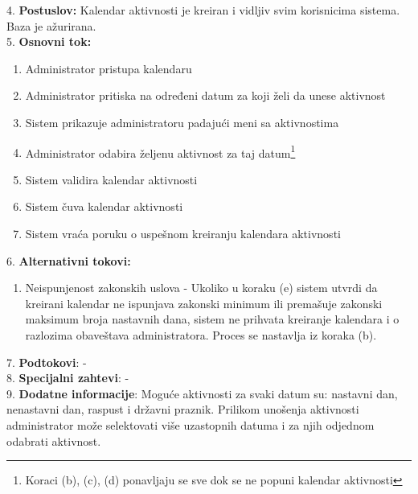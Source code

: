 \documentclass{article}
\begin{document}
4. \textbf{Postuslov:} Kalendar aktivnosti je kreiran i vidljiv svim korisnicima sistema. Baza je ažurirana. \\

5. \textbf{Osnovni tok:} 
\begin{enumerate} [label=(\alph*)]
\item Administrator pristupa kalendaru
\item Administrator pritiska na određeni datum za koji želi da unese aktivnost
\item Sistem prikazuje administratoru padajući meni sa aktivnostima
\item Administrator odabira željenu aktivnost za taj datum\footnote{Koraci (b), (c), (d) ponavljaju se sve dok se ne popuni kalendar aktivnosti}
\item Sistem validira kalendar aktivnosti
\item Sistem čuva kalendar aktivnosti
\item Sistem vraća poruku o uspešnom kreiranju kalendara aktivnosti
\end{enumerate}

6. \textbf{Alternativni tokovi:}
\begin{enumerate} [label=(\roman*)]
\item Neispunjenost zakonskih uslova - Ukoliko u koraku (e) sistem utvrdi da kreirani kalendar ne ispunjava zakonski minimum ili premašuje zakonski maksimum broja nastavnih dana, sistem ne prihvata kreiranje kalendara i o razlozima obaveštava administratora. Proces se nastavlja iz koraka (b).
\end{enumerate}

7. \textbf{Podtokovi}:  - \\

8. \textbf{Specijalni zahtevi}: - \\

9. \textbf{Dodatne informacije}: Moguće aktivnosti za svaki datum su: nastavni dan, nenastavni dan, raspust i državni praznik. Prilikom unošenja aktivnosti administrator može selektovati više uzastopnih datuma i za njih odjednom odabrati aktivnost. \\
\end{document}
